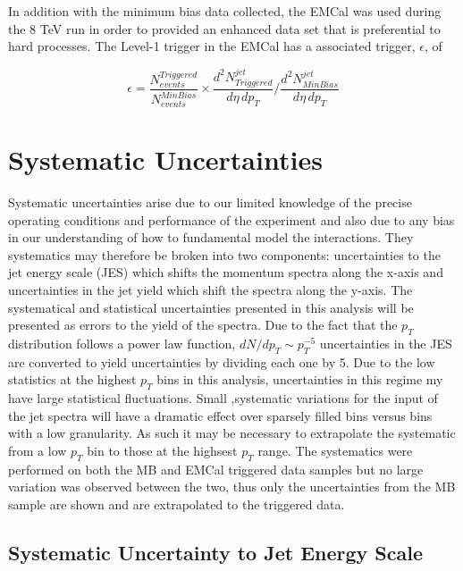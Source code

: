 In addition with the minimum bias data collected, the EMCal was used during the 8 TeV run in order to provided an enhanced data set that is preferential to hard processes.   The Level-1 trigger\cite{Bourrion:2010js} in the EMCal has a associated trigger, $\epsilon$, of 

\begin{equation}
	\epsilon = \frac{N^{Triggered}_{events}}{N^{MinBias}_{events}} \times \frac{d^{2} N_{Triggered}^{jet}}{d\eta \, dp_{T}} \Bigg/  \frac{d^{2} N_{MinBias}^{jet}}{d\eta \, dp_{T}} 
\label{eq:xsecdef}
\end{equation}

\section{Systematic Uncertainties}

Systematic uncertainties arise due to our limited knowledge of the precise operating conditions and performance of the experiment and also due to any bias in our understanding of how to fundamental model the interactions.  They systematics may therefore be broken into two components: uncertainties to the jet energy scale (JES) which shifts the momentum spectra along the x-axis and uncertainties in the jet yield which shift the spectra along the y-axis.  The systematical and statistical uncertainties presented in this analysis will be presented as errors to the yield of the spectra.  Due to the fact that the $p_{T}$ distribution follows a power law function, $dN/dp_{T} \sim p_{T}^{-5}$ uncertainties in the JES are converted to yield uncertainties by dividing each one by 5.
Due to the low statistics at the highest $p_{T}$ bins in this analysis, uncertainties in this regime my have large statistical fluctuations.  Small ,systematic variations for the input of the jet spectra will have a dramatic effect over sparsely filled bins versus bins with a low granularity.  As such it may be necessary to extrapolate the systematic from a low $p_{T}$ bin to those at the highsest $p_{T}$ range.  The systematics were performed on both the MB and EMCal triggered data samples but no large variation was observed between the two, thus only the uncertainties from the MB sample are shown and are extrapolated to the triggered data.


\subsection{Systematic Uncertainty to Jet Energy Scale}

